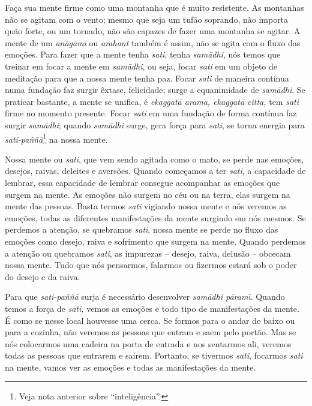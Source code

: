 Faça sua mente firme como uma montanha que é muito resistente. As
montanhas não se agitam com o vento; mesmo que seja um tufão soprando,
não importa quão forte, ou um tornado, não são capazes de fazer uma
montanha se agitar. A mente de um \textit{an\=ag\=am\=\i} ou
\textit{arahant} também é assim, não se agita com o fluxo das emoções.
Para fazer que a mente tenha \textit{sati}, tenha \textit{sam\=adhi},
nós temos que treinar em focar a mente em \textit{sam\=adhi}, ou seja,
focar \textit{sati} em um objeto de meditação para que a nossa mente
tenha paz. Focar \textit{sati }de maneira contínua numa fundação faz
surgir êxtase, felicidade; surge a equanimidade de \textit{sam\=adhi}.
Se praticar bastante, a mente se unifica, é \textit{ekaggat\=a arama,
ekaggat\=a citta,} tem \textit{sati }firme no momento presente. Focar
\textit{sati }em uma fundação de forma contínua faz surgir
\textit{sam\=adhi}; quando \textit{sam\=adhi }surge, gera força para
\textit{sati}, se torna energia para
\textit{sati-paññ\=a}\footnote{Veja nota anterior sobre
“inteligência”.} na nossa mente.

Nossa mente ou \textit{sati}, que vem sendo agitada como o mato, se
perde nas emoções, desejos, raivas, deleites e aversões. Quando
começamos a ter \textit{sati}, a capacidade de lembrar, essa capacidade
de lembrar consegue acompanhar as emoções que surgem na mente. As
emoções não surgem no céu ou na terra, elas surgem na mente das
pessoas. Basta termos \textit{sati }vigiando nossa mente e nós veremos
as emoções, todas as diferentes manifestações da mente surgindo em nós
mesmos. Se perdemos a atenção, se quebramos \textit{sati}, nossa mente
se perde no fluxo das emoções como desejo, raiva e sofrimento que
surgem na mente. Quando perdemos a atenção ou quebramos \textit{sati},
as impurezas – desejo, raiva, delusão – obcecam nossa mente. Tudo que
nós pensarmos, falarmos ou fizermos estará sob o poder do desejo e da
raiva.

Para que \textit{sati-paññ\=a }surja é necessário desenvolver
\textit{sam\=adhi p\=aram\=\i}. Quando temos a força de \textit{sati,}
vemos as emoções e todo tipo de manifestações da mente. É como se nesse
local houvesse uma cerca. Se formos para o andar de baixo ou para a
cozinha, não veremos as pessoas que entram e saem pelo portão. Mas se
nós colocarmos uma cadeira na porta de entrada e nos sentarmos ali,
veremos todas as pessoas que entrarem e saírem. Portanto, se tivermos
\textit{sati}, focarmos \textit{sati }na mente, vamos ver as emoções e
todas as manifestações da mente.

